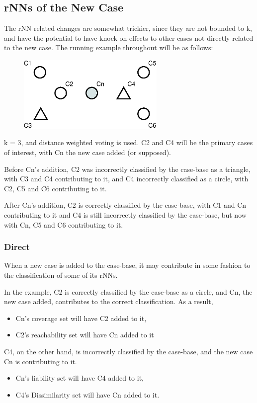\documentclass[a4paper,11pt]{report}
\begin{document}
\subsection{rNNs of the New Case}
The rNN related changes are somewhat trickier, since they are not bounded to k, and have the potential to have knock-on effects to other cases not directly related to the new case.
The running example throughout will be as follows:

\begin{figure}[h!] 
\centering
\includegraphics[width=200pt]{./Drawn/rNNExample}
\end{figure}

k = 3, and distance weighted voting is used. C2 and C4 will be the primary cases of interest, with Cn the new case added (or supposed).

Before Cn's addition, C2 was incorrectly classified by the case-base as a triangle, with C3 and C4 contributing to it, and C4 incorrectly classified as a circle, with C2, C5 and C6 contributing to it.

After Cn's addition, C2 is correctly classified by the case-base, with C1 and Cn contributing to it and C4 is still incorrectly classified by the case-base, but now with Cn, C5 and C6 contributing to it.

\subsubsection{Direct\label{sec:direct}}
When a new case is added to the case-base, it may contribute in some fashion to the classification of some of its rNNs.

In the example, C2 is correctly classified by the case-base as a circle, and Cn, the new case added, contributes to the correct classification. As a result,
\begin{itemize}
	\item Cn's coverage set will have C2 added to it, 
	\item C2's reachability set will have Cn added to it
\end{itemize}

C4, on the other hand, is incorrectly classified by the case-base, and the new case Cn is contributing to it.
\begin{itemize}
	\item Cn's liability set will have C4 added to it,
	\item C4's Dissimilarity set will have Cn added to it.
\end{itemize}
\end{document}

